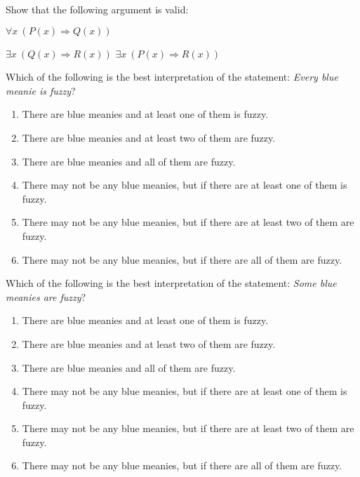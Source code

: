 \begin{exercise}
Show that the following argument is valid:
{\setlength\linwid{1.5in}
\begin{centeredarg}
\item $\forall x\ (P(x)\Rightarrow Q(x))$
\item $\exists x\ (Q(x)\Rightarrow R(x))$
\hence $\exists x\ (P(x)\Rightarrow R(x))$
\end{centeredarg}}
\end{exercise}

\begin{exercise}
Which of the following is the best interpretation of the statement: \emph{Every blue meanie is fuzzy}?
\begin{enumerate}
\item There are blue meanies and at least one of them is fuzzy.
\item There are blue meanies and at least two of them are fuzzy.
\item There are blue meanies and all of them are fuzzy.
\item There may not be any blue meanies, but if there are at least one of them is fuzzy.
\item There may not be any blue meanies, but if there are at least two of them are fuzzy.
\item There may not be any blue meanies, but if there are all of them are fuzzy.
\end{enumerate}
\end{exercise}

\begin{exercise}
Which of the following is the best interpretation of the statement: \emph{Some blue meanies are fuzzy}?
\begin{enumerate}
\item There are blue meanies and at least one of them is fuzzy.
\item There are blue meanies and at least two of them are fuzzy.
\item There are blue meanies and all of them are fuzzy.
\item There may not be any blue meanies, but if there are at least one of them is fuzzy.
\item There may not be any blue meanies, but if there are at least two of them are fuzzy.
\item There may not be any blue meanies, but if there are all of them are fuzzy.
\end{enumerate}
\end{exercise}

